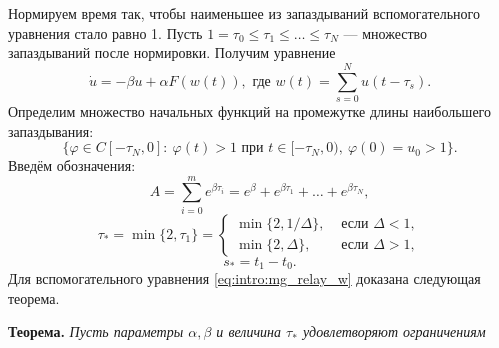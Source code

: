 Нормируем время так, чтобы наименьшее из запаздываний вспомогательного уравнения стало равно 1. Пусть $1 = \tau_0 \leq \tau_1 \leq \ldots \leq \tau_N$ --- множество запаздываний после нормировки. Получим уравнение 
\begin{equation}
	\label{eq:intro:mg_relay_w}
	\dot{u}=-\beta u+\alpha F(w(t)), \text{ где } w(t) = \sum\limits_{s = 0}^N u(t - \tau_s).
\end{equation}
%
Определим множество начальных функций на промежутке длины наибольшего запаздывания: 
%
\begin{equation}
	\label{eq:intro:mg_init_set}
	\{\varphi\in C[-\tau_{N},0]:\  \varphi(t)>1 \text{ при } t\in[-\tau_{N},0),\ \varphi(0)=u_0 > 1\}.
\end{equation}
%
Введём обозначения:
%
\begin{equation*}
	A = \sum_{i=0}^{m}e^{\beta \tau_{i}}=e^\beta+e^{\beta \tau_1}+\ldots+e^{\beta \tau_{N}},
\end{equation*}
\begin{equation*}
	\tau_* = \min\{2,\tau_1\}=\left\lbrace\begin{array}{cl}
		\min\{2,1/\Delta\}, & \text{ если } \Delta < 1,
		\\
		\min\{2,\Delta\}, & \text{ если } \Delta > 1,
	\end{array}\right.
\end{equation*}
\begin{equation*}
	s_* = t_1-t_0.
\end{equation*}
%
Для вспомогательного уравнения \eqref{eq:intro:mg_relay_w} доказана следующая теорема.

\textbf{Теорема.} \textit{Пусть параметры $\alpha, \beta$ и величина $\tau_*$ удовлетворяют ограничениям}

